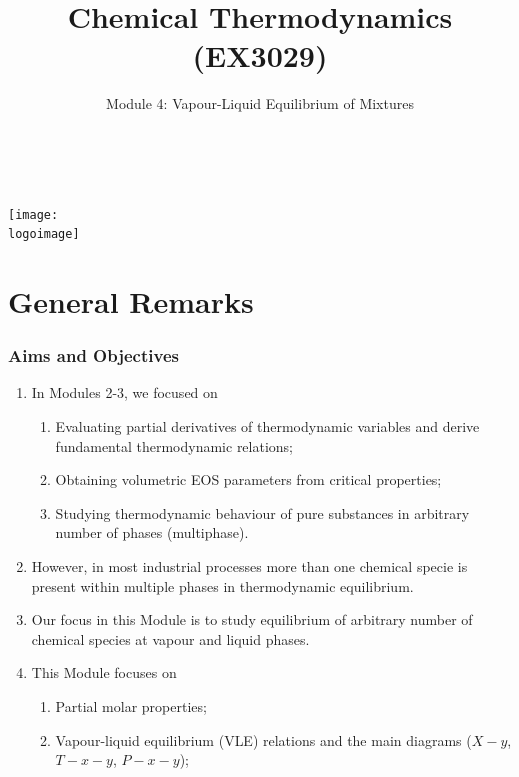 \documentclass[10pt,compress,handout]{beamer}
\institute{School of Engineering}
\title{Chemical Thermodynamics (EX3029)}
\subtitle{Module 4: Vapour-Liquid Equilibrium of Mixtures}
\date[ ]{ }
\author[\shortname]{%
  \fullname\\\ttfamily{\emailaddress}
}
\newcommand{\logoimage}{../../FigBanner/UoAHorizBanner}
\begin{document}
\begin{frame}
  \titlepage
  \vfill%
  \begin{center}
    \texttt{[image: \\logoimage]}
  \end{center}
\end{frame}




\section{General Remarks}

\begin{frame}
 \frametitle{Aims and Objectives}
   \begin{enumerate}
     \item<1-> In Modules 2-3, we focused on 
       \begin{enumerate}
         \item<1-> Evaluating partial derivatives of thermodynamic variables and derive fundamental thermodynamic relations;
         \item<1-> Obtaining volumetric EOS parameters from critical properties;
         \item<1-> Studying thermodynamic behaviour of pure substances in arbitrary number of phases (multiphase).
       \end{enumerate} 
     \item<2-> However, in most industrial processes more than one chemical specie is present within multiple phases in thermodynamic equilibrium. 
     \item<3-> Our focus in this Module is to study equilibrium of arbitrary number of chemical species at vapour and liquid phases.
     \item<4-> This Module focuses on 
         \begin{enumerate}
           \item<4-> Partial molar properties; 
           \item<4-> Vapour-liquid equilibrium (VLE) relations and the main diagrams ($X-y$, $T-x-y$, $P-x-y$); 
         \end{enumerate}
   \end{enumerate}
\end{frame}
\end{document}
